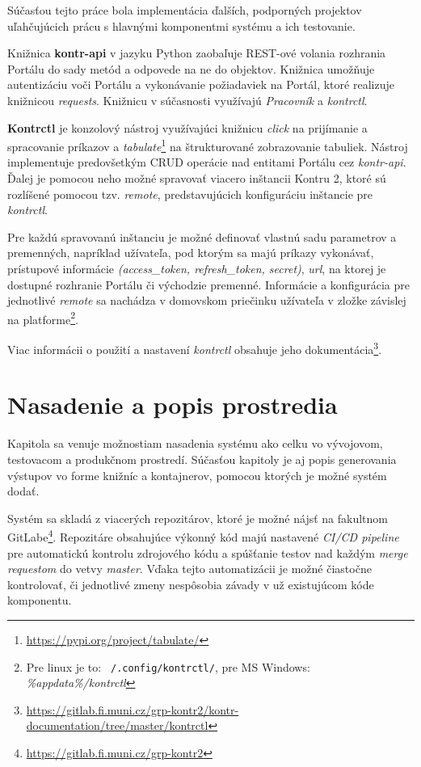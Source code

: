\documentclass[
  digital, %
  twoside, %
  table,   %
  lof,     %
  lot,     %
]{fithesis3}
\newcommand*{\footurl}[1]{\footnote{\url{#1}}}
\begin{document}
\label{impl-other-parts}
Súčasťou tejto práce bola implementácia ďalších, podporných projektov uľahčujúcich prácu s hlavnými komponentmi systému a ich testovanie.

Knižnica \textbf{kontr-api} v jazyku Python zaobaľuje REST-ové volania rozhrania Portálu do sady metód a odpovede na ne do objektov. Knižnica umožňuje autentizáciu voči Portálu a vykonávanie požiadaviek na Portál, ktoré realizuje knižnicou \emph{requests}. Knižnicu v súčasnosti využívajú \emph{Pracovník} a \emph{kontrctl}. 

\textbf{Kontrctl} je konzolový nástroj využívajúci knižnicu \emph{click} na prijímanie a spracovanie príkazov a \emph{tabulate}\footurl{https://pypi.org/project/tabulate/} na štrukturované zobrazovanie tabuliek. Nástroj implementuje predovšetkým CRUD operácie nad entitami Portálu cez \emph{kontr-api}. Ďalej je pomocou neho možné spravovať viacero inštancii Kontru 2, ktoré sú rozlíšené pomocou tzv. \emph{remote}, predstavujúcich konfiguráciu inštancie pre \emph{kontrctl}.

Pre každú spravovanú inštanciu je možné definovať vlastnú sadu parametrov a premenných, napríklad užívateľa, pod ktorým sa majú príkazy vykonávať, prístupové informácie \emph{(access\_token, refresh\_token, secret)}, \emph{url}, na ktorej je dostupné rozhranie Portálu či východzie premenné. Informácie a konfigurácia pre jednotlivé \emph{remote} sa nachádza v domovskom priečinku užívateľa v zložke závislej na platforme\footnote{Pre linux je to: \texttt{~/.config/kontrctl/}, pre MS Windows: \emph{\%appdata\%/kontrctl}}.

Viac informácii o použití a nastavení \emph{kontrctl} obsahuje jeho dokumentácia\footnote{\url{https://gitlab.fi.muni.cz/grp-kontr2/kontr-documentation/tree/master/kontrctl}}.

\chapter{Nasadenie a popis prostredia}

Kapitola sa venuje možnostiam nasadenia systému ako celku vo vývojovom, testovacom a produkčnom prostredí. Súčasťou kapitoly je aj popis generovania výstupov vo forme knižníc a kontajnerov, pomocou ktorých je možné systém dodať.

Systém sa skladá z viacerých repozitárov, ktoré je možné nájsť na fakultnom GitLabe\footnote{\url{https://gitlab.fi.muni.cz/grp-kontr2}}. Repozitáre obsahujúce výkonný kód majú nastavené \emph{CI/CD pipeline} pre automatickú kontrolu zdrojového kódu a spúšťanie testov nad každým \emph{merge requestom} do vetvy \emph{master}. Vďaka tejto automatizácii je možné čiastočne kontrolovať, či jednotlivé zmeny nespôsobia závady v už existujúcom kóde komponentu.
\end{document}
